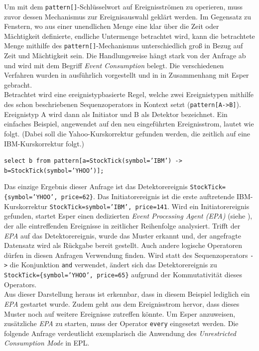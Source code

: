 \documentclass{acm_proc_article-sp}
\begin{document}
Um mit dem \texttt{pattern[]}-Schlüsselwort auf Ereignisströmen zu operieren, muss zuvor 
dessen Mechanismus zur Ereignisauswahl geklärt werden. Im Gegensatz zu Fenstern, wo aus 
einer unendlichen Menge eine klar über die Zeit oder Mächtigkeit definierte, endliche 
Untermenge betrachtet wird, kann die betrachtete Menge mithilfe des 
\texttt{pattern[]}-Mechanismus unterschiedlich groß in Bezug auf Zeit und Mächtigkeit 
sein. Die Handlungsweise hängt stark von der Anfrage ab und wird mit dem Begriff  
\textit{Event Consumption} belegt. Die verschiedenen Verfahren wurden in 
\cite{adaikkalavan} ausführlich vorgestellt und in \cite{hedtstuck} in Zusammenhang mit 
Esper gebracht.\\
Betrachtet wird eine ereignistypbasierte Regel, welche zwei Ereignistypen 
mithilfe des schon beschriebenen Sequenzoperators in Kontext setzt 
(\texttt{pattern[A->B]}). Ereignistyp A wird dann als Initiator und B als Detektor 
bezeichnet. Ein einfaches Beispiel, angewendet auf den neu eingeführten Ereignisstrom, 
lautet wie folgt. (Dabei soll die Yahoo-Kurskorrektur gefunden werden, die zeitlich 
auf eine IBM-Kurskorrektur folgt.)

\texttt{select b from pattern[a=StockTick(symbol='IBM') ->\\ 
b=StockTick(symbol='YHOO')];}

Das einzige Ergebnis dieser Anfrage ist das Detektorereignis 
\texttt{StockTick=\{symbol='YHOO', price=62\}}. Das Initiatorereignis ist die erste 
auftretende IBM-Kurskorrektur \texttt{StockTick={symbol='IBM', price=141}}. Wird ein 
Initiatorereignis gefunden, startet Esper einen dedizierten \textit{Event Processing 
Agent (EPA)} (siehe \cite{bruns}), der alle eintreffenden Ereignisse in zeitlicher 
Reihenfolge analysiert. Trifft der \textit{EPA} auf das Detektorereignis, wurde das 
Muster 
erkannt und, der angefragte Datensatz wird als Rückgabe bereit gestellt. Auch andere 
logische Operatoren dürfen in diesen Anfragen Verwendung finden. Wird statt des 
Sequenzoperators \texttt{->} die Konjunktion \texttt{and} verwendet, ändert sich das 
Detektorereignis zu \texttt{StockTick=\{symbol='YHOO', price=65\}} aufgrund der 
Kommutativität dieses Operators.\\
Aus dieser Darstellung heraus ist erkennbar, dass in diesem Beispiel lediglich ein 
\textit{EPA} gestartet wurde. Zudem geht aus dem Ereignisstrom hervor, dass dieses Muster 
noch auf weitere Ereignisse zutreffen könnte. Um Esper anzuweisen, zusätzliche 
\textit{EPA} zu starten, muss der Operator \texttt{every} eingesetzt werden. Die folgende 
Anfrage verdeutlicht exemplarisch die Anwendung des 
\textit{Unrestricted Consumption Mode} in EPL.
\end{document}
